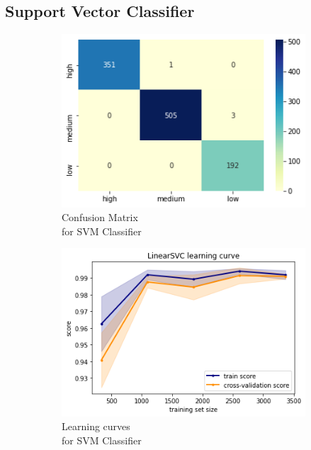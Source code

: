 \subsection{Support Vector Classifier}
\begin{figure}[h!]
     \captionsetup{justification=centering}             
     \centering
     \begin{subfigure}{0.49\textwidth}
         \centering
         \captionsetup{type=figure}
         \includegraphics[width=\textwidth]{img/classification/svm_confusion.png}
         \caption{Confusion Matrix \\ for SVM Classifier}
         \label{fig:svm_confusion}
     \end{subfigure}
     \begin{subfigure}{0.49\textwidth}
         \centering
         \includegraphics[width=\textwidth]{img/classification/svm_lc.png}
         \caption{Learning curves \\ for SVM Classifier}
         \label{fig:svm_lc}
     \end{subfigure}
     \caption{}
    \label{fig:svm}
\end{figure}

